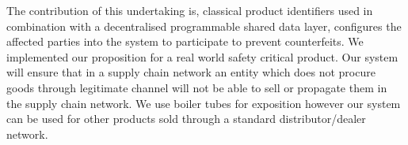 \documentclass{article}
\begin{document}
The contribution of this undertaking is, classical product identifiers used in combination with a decentralised programmable shared data layer, configures the affected parties into the system to participate to prevent counterfeits. 
We implemented our proposition for a real world safety critical product. Our system will ensure that in a supply chain network an entity which does not procure goods through legitimate channel will not be able to sell or propagate them in the supply chain network. We use boiler tubes for exposition however our system can be used for other products sold through a standard distributor/dealer network. 
\end{document}
